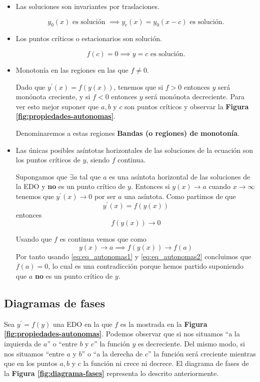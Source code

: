 \begin{itemize}
\item Las soluciones son invariantes por traslaciones.

$$y_0(x) \text{ es solución } \implies y_c(x) = y_0(x-c) \text{ es solución.}$$

\item Los puntos críticos o estacionarios son solución.

$$f(c) = 0 \implies y=c \text{ es solución.}$$

\item Monotonía en las regiones en las que $f\neq 0$.

Dado que $y^\prime(x) = f(y(x))$, tenemos que si $f\gt0$ entonces $y$ será monónota creciente, y si $f\lt0$ entonces $y$ será monónota decreciente. Para ver esto mejor suponer que $a,b$ y $c$ son puntos críticos y observar la \textbf{Figura \ref{fig:propiedades-autonomas}}.

Denominaremos a estas regiones \textbf{Bandas (o regiones) de monotonía}.

\item Las únicas posibles asíntotas horizontales de las soluciones de la ecuación son los puntos críticos de $y$, siendo $f$ continua.

Supongamos que $\exists a $ tal que $a$ es una asíntota horizontal de las soluciones de la EDO y \textbf{no} es un punto crítico de $y$. Entonces si $y(x)\to a$ cuando $x\to \infty$ tenemos que $y^\prime(x)\to 0$ por ser $a$ una asíntota. Como partimos de que $$y^\prime(x) = f(y(x))$$ entonces
\begin{equation}
f(y(x))\to 0
\label{eq:eq_autonomas1}
\end{equation}

Usando que $f$ es continua vemos que como 
\begin{equation}
y(x)\to a \implies f(y(x))\to f(a)
\label{eq:eq_autonomas2}
\end{equation}
Por tanto usando \ref{eq:eq_autonomas1} y \ref{eq:eq_autonomas2} concluimos que $f(a) = 0$, lo cual es una contradicción porque hemos partido suponiendo que $a$ \textbf{no} es un punto crítico de $y$.
\end{itemize}

\subsection{Diagramas de fases}
Sea $y^\prime = f(y)$ una EDO en la que $f$ es la mostrada en la \textbf{Figura \ref{fig:propiedades-autonomas}}. Podemos observar que si nos situamos ``a la izquierda de $a$'' o ``entre $b$ y $c$'' la función $y$ es decreciente. Del mismo modo, si nos situamos ``entre $a$ y $b$'' o ``a la derecha de $c$'' la función será creciente mientras que en los puntos $a, b$ y $c$ la función ni crece ni decrece. El diagrama de fases de la \textbf{Figura \ref{fig:diagrama-fases}} representa lo descrito anteriormente. 

